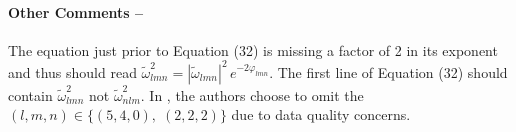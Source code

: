 \documentclass[notitlepage,prd,article,floatfix,preprintnumbers,a4paper,nofootinbib,superscriptaddress]{revtex4-1}
\def\cw{\tilde{\omega}}
\begin{document}
\paragraph*{Other Comments --} The equation just prior to Equation (32) is missing a factor of 2 in its exponent and thus should read $\cw^2_{lmn} = |\cw_{lmn}|^2 \, e^{-2\varphi_{lmn}}$.
%
The first line of Equation (32) should contain $\cw^2_{lmn}$ not $\cw^2_{nlm}$.
%
In , the authors choose to omit the $(l,m,n) \in \{ (5,4,0), \; (2,2,2) \}$  due to data quality concerns.



\end{document}
